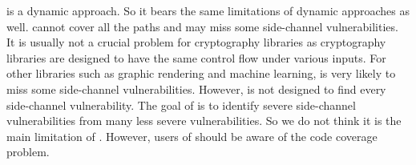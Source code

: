 \ctool{} is a dynamic approach. So it bears the same limitations of dynamic approaches as well. \ctool{} cannot cover all the paths and may miss some side-channel vulnerabilities. It is usually not a crucial problem for cryptography libraries as cryptography libraries are designed to have the same control flow under various inputs. For other libraries such as graphic rendering and machine learning, \ctool{} is very likely to miss some side-channel vulnerabilities. However, \ctool{} is not designed to find every side-channel vulnerability. The goal of \ctool{} is to identify severe side-channel vulnerabilities from many less severe vulnerabilities. So we do not think it is the main limitation of \ctool{}. However, users of \ctool{} should be aware of the code coverage problem.






 